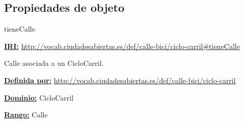 \subsection{Propiedades de objeto}


\begin{mybox}{tieneCalle}
\begin{flushleft}
\underline{\textbf{IRI:}}
\url{http://vocab.ciudadesabiertas.es/def/calle-bici/ciclo-carril#tieneCalle}
\newline

Calle asociada a un CicloCarril.
\newline

\underline{\textbf{Definida por:}}
\url{http://vocab.ciudadesabiertas.es/def/calle-bici/ciclo-carril}
\newline

\underline{\textbf{Dominio:}}
		CicloCarril
\newline

\underline{\textbf{Rango:}}
		Calle
\newline


\end{flushleft}
\end{mybox}



